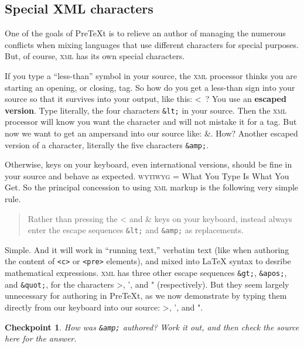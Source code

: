 \documentclass{sn-jnl}
\theoremstyle{thmstyleone}%
\theoremstyle{thmstyletwo}%
\newtheorem{inlineexercise}[theorem]{Checkpoint}
\theoremstyle{thmstylethree}%
\newcommand{\mono}[1]{\texttt{#1}}
\newcommand{\initialism}[1]{\textsc{\MakeLowercase{#1}}}
\DeclareRobustCommand{\initialismintitle}[1]{\texorpdfstring{#1}{#1}}
\newcommand{\terminology}[1]{\textbf{#1}}
\numberwithin{equation}{section}
\begin{document}
\subsection{Special \initialismintitle{XML} characters}\label{subsection-xml-escape}%
One of the goals of PreTeXt is to relieve an author of managing the numerous conflicts when mixing languages that use different characters for special purposes.  But, of course, \initialism{XML} has its own special characters.%
\par
If you type a ``less-than'' symbol in your source, the \initialism{XML} processor thinks you are starting an opening, or closing, tag.  So how do you get a less-than sign into your source so that it survives into your output, like this: \textless{}~?  You use an \terminology{escaped version}.  Type literally, the four characters \mono{\&lt;} in your source.  Then the \initialism{XML} processor will know you want the character and will not mistake it for a tag.  But now we want to get an ampersand into our source like: \&.  How?  Another escaped version of a character, literally the five characters \mono{\&amp;}.%
\par
Otherwise, keys on your keyboard, even international versions, should be fine in your source and behave as expected.  \initialism{WYTIWYG} = What You Type Is What You Get.  So the principal concession to using \initialism{XML} markup is the following very simple rule.%
\begin{quote}%
Rather than pressing the \textless{} and \& keys on your keyboard, instead always enter the escape sequences \mono{\&lt;} and \mono{\&amp;} as replacements.%
\end{quote}
Simple.  And it will work in ``running text,'' verbatim text (like when authoring the content of \mono{<c>} or \mono{<pre>} elements), and mixed into \LaTeX{} syntax to desribe mathematical expressions.  \initialism{XML} has three other escape sequences \mono{\&gt;}, \mono{\&apos;}, and \mono{\&quot;}, for the characters \textgreater{}, ', and " (respectively).  But they seem largely unnecessary for authoring in PreTeXt, as we now demonstrate by typing them directly from our keyboard into our source: \textgreater{}, ', and ".%
\begin{inlineexercise}\label{subsection-xml-escape-7}%
%
How was \mono{\&amp;} authored?  Work it out, and then check the source here for the answer.%
\end{inlineexercise}%
%
%
\typeout{************************************************}
\typeout{************************************************}
%
\end{document}
